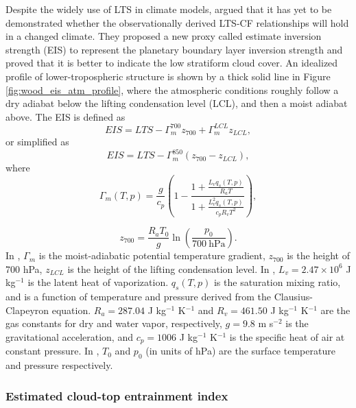 Despite the widely use of LTS in climate models, \cite{Wood2006} argued that it has yet to be demonstrated whether the observationally derived LTS-CF relationships will hold in a changed climate. They proposed a new proxy called estimate inversion strength (EIS)  to represent the planetary boundary layer inversion strength and proved that it is better to indicate the low stratiform cloud cover. An idealized profile of lower-tropospheric structure is shown by a thick solid line in Figure \ref{fig:wood_eis_atm_profile}, where the atmospheric conditions roughly follow a dry adiabat below the lifting condensation level (LCL), and then a moist adiabat above. The EIS is defined as
\begin{equation}
    EIS=LTS-\Gamma_{m}^{700} z_{700}+\Gamma_{m}^{LCL} z_{LCL},
    \label{eq:eis}
\end{equation}
or simplified as
\begin{equation}
    EIS=LTS-\Gamma_{m}^{850}\left(z_{700}-z_{LCL}\right),
\end{equation}
where 
\begin{equation}
    \Gamma_m(T, p) = \frac{g}{c_{p}}\left(1-\frac{1 + \frac{L_{v} q_{s}(T, p)}{R_{a} T}}{1+ \frac{L_{v}^{2} q_{s}(T, p)}{c_{p} R_{v} T^{2}}}\right),
    \label{eq:gamma_m}
\end{equation}

\begin{equation}
	z_{700}=\frac{R_{a} T_{0}}{g} \ln \left(\frac{p_{0}}{700~ \mathrm{hPa}}\right).
	\label{eq:z700}
\end{equation}
In , $\Gamma_{m}$ is the moist-adiabatic potential temperature gradient, $z_{700}$ is the height of 700 hPa, $z_{LCL}$ is the height of the lifting condensation level. In , $L_v=2.47\times 10^6$ J kg$^{-1}$ is the latent heat of vaporization. $q_s(T,p)$ is the saturation mixing ratio, and is a function of temperature and pressure derived from the Clausius-Clapeyron equation. $R_a=287.04$ J kg$^{-1}$ K$^{-1}$ and $R_v=461.50$ J kg$^{-1}$ K$^{-1}$ are the gas constants for dry and water vapor, respectively, $g=9.8$ m s$^{-2}$ is the gravitational acceleration, and $c_p=1006$ J kg$^{-1}$ K$^{-1}$ is the specific heat of air at constant pressure. In , $T_0$ and $p_0$ (in units of hPa) are the surface temperature and pressure respectively.

\subsubsection{Estimated cloud-top entrainment index}


